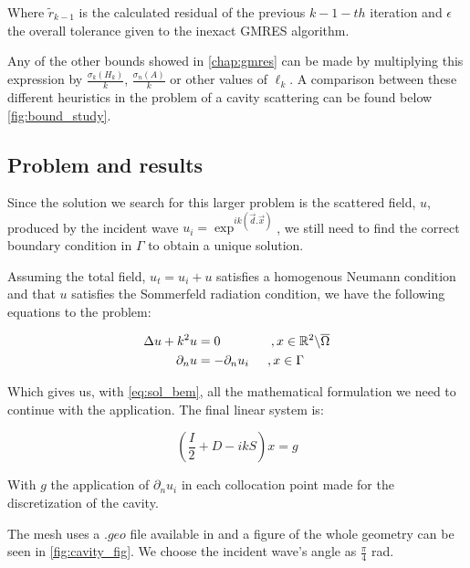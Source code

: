 Where $\tilde{r}_{k-1}$ is the calculated residual of the previous $k-1-th$ iteration and $\epsilon$ the overall tolerance given to the inexact GMRES algorithm.

Any of the other bounds showed in \autoref{chap:gmres} can be made by multiplying this expression by $\frac{\sigma_{k}(H_{k})}{k}$, $\frac{\sigma_{n}(A)}{k}$ or other values of $\ell_{k}$. A comparison between these different heuristics in the problem of a cavity scattering can be found below \ref{fig:bound_study}.

\subsection{Problem and results}

Since the solution we search for this larger problem is the scattered field, $u$, produced by the incident wave $u_{i} = \exp^{ik(\vec{d}.\vec{x})}$, we still need to find the correct boundary condition in $\Gamma$ to obtain a unique solution.

Assuming the total field, $u_{t} = u_{i} + u $ satisfies a homogenous Neumann condition and that $u$ satisfies the Sommerfeld radiation condition, we have the following equations to the problem:

\begin{align}\label{eq:cavity_pdes}
    \begin{split}
        \Delta u + k^{2}u &= 0\hspace{0.55in}, x \in \mathbb{R}^{2} \backslash \overline{\Omega} \\
        \partial_{n} u &= -\partial_{n}u_{i}\hspace{0.2in}, x \in \Gamma
    \end{split}
\end{align}

Which gives us, with \ref{eq:sol_bem}, all the mathematical formulation we need to continue with the application. The final linear system is:

\begin{equation}
    \left( \frac{I}{2} + D - ikS \right) x = g
\end{equation}

With $g$ the application of $\partial_{n} u_{i}$ in each collocation point made for the discretization of the cavity.

The mesh uses a $.geo$ file
available in \cite{git_dudu} and a figure of the whole geometry can be seen in \ref{fig:cavity_fig}. We choose the incident wave's angle as $\frac{\pi}{4}$ rad.

